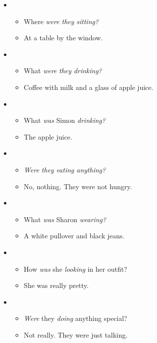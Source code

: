 \begin{itemize}

\item
\begin{itemize}
\item Where \textit{were they sitting?}
\item At a table by the window.
\end{itemize}

\item
\begin{itemize}
\item What \textit{were they drinking?}
\item Coffee with milk and a glass of apple juice.
\end{itemize}

\item
\begin{itemize}
\item What \textit{was} Simon \textit{drinking?}
\item The apple juice.
\end{itemize}

\item
\begin{itemize}
\item \textit{Were they eating anything?}
\item No, nothing. They were not hungry.
\end{itemize}

\item
\begin{itemize}
\item What \textit{was} Sharon \textit{wearing?}
\item {A white pullover and black jeans}.
\end{itemize}

\item
\begin{itemize}
\item How \textit{was} she \textit{looking} in her outfit?
\item She was really pretty.
\end{itemize}

\item
\begin{itemize}
\item \textit{Were} they \textit{doing} anything special?
\item Not really. They were just talking.
\end{itemize}


\end{itemize}
